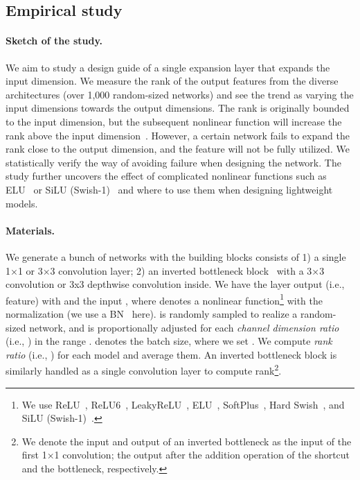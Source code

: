 \vspace{-1mm}
\subsection{Empirical study}\label{subsection:sec_empirical_study}
\vspace{-1mm}
\paragraph{Sketch of the study.}
We aim to study a design guide of a single expansion layer that expands the input dimension. We measure the rank of the output features from the diverse architectures (over 1,000 random-sized networks) and see the trend as varying the input dimensions towards the output dimensions. The rank is originally bounded to the input dimension, but the subsequent nonlinear function will increase the rank above the input dimension~\cite{amini2011low, yang2017breaking}. However, a certain network fails to expand the rank close to the output dimension, and the feature will not be fully utilized. We statistically verify the way of avoiding failure when designing the network. The study further uncovers the effect of complicated nonlinear functions such as ELU~\cite{elu} or SiLU (Swish-1)~\cite{gelu,swish} and where to use them when designing lightweight models.

\vspace{-4mm}
\paragraph{Materials.}
We generate a bunch of networks with the building blocks consists of 1) a single 1×1 or 3×3 convolution layer; 2) an inverted bottleneck block~\cite{mobilenetv2} with a 3×3 convolution or 3x3 depthwise convolution inside. We have the layer output (i.e., feature)  with  and the input , where  denotes a nonlinear 
function\footnote{We use ReLU~\cite{relu}, ReLU6~\cite{mobilenetv2},
LeakyReLU~\cite{leakyrelu},
ELU~\cite{elu}, SoftPlus~\cite{softplus}, Hard Swish~\cite{mobilenetv3}, and SiLU (Swish-1)~\cite{gelu,swish}.} with the normalization (we use a BN~\cite{BN} here).  is randomly sampled to realize a random-sized network, and  is proportionally adjusted for each {\it channel dimension ratio} (i.e., ) in the range .  denotes the batch size, where we set .
We compute {\it rank ratio} (i.e., ) for each model and average them. An inverted bottleneck block is similarly handled as a single convolution layer to compute rank\footnote{We denote the input and output of an inverted bottleneck as the input of the first 1×1 convolution; the output after the addition operation of the shortcut and the bottleneck, respectively.}. 


